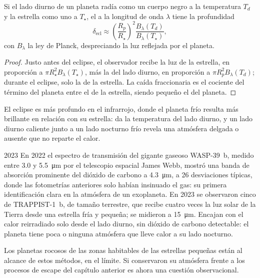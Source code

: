 \begin{proposition}\label{prop:b3:exoplanets:eclipse}
Si el lado diurno de un planeta radía como un cuerpo negro a la temperatura
$T_d$ y la estrella como uno a $T_\star$, el  a la
longitud de onda $\lambda$ tiene la profundidad
\[
\delta_\mathrm{ecl} \approx \left(\frac{R_p}{R_\star}\right)^2
  \frac{B_\lambda(T_d)}{B_\lambda(T_\star)},
\]
con $B_\lambda$ la ley de Planck, despreciando la luz reflejada por el planeta.
\end{proposition}

\begin{proof}
Justo antes del eclipse, el observador recibe la luz de la estrella, en
proporción a $\pi R_\star^2 B_\lambda(T_\star)$, más la del lado diurno,
en proporción a $\pi R_p^2 B_\lambda(T_d)$; durante el eclipse, solo la
de la estrella. La caída fraccionaria es el cociente del término del planeta
entre el de la estrella, siendo pequeño el del planeta.
\end{proof}

El eclipse es más profundo en el infrarrojo, donde el planeta frío resulta
más brillante en relación con su estrella: da la temperatura del lado diurno, y
un lado diurno caliente junto a un lado nocturno frío revela una atmósfera delgada o ausente
que no reparte el calor.

\begin{dated}{2023}
En 2022 el espectro de transmisión del gigante gaseoso WASP-39~b, medido
entre 3.0 y \qty{5.5}{\micro m} por el telescopio espacial James Webb,
mostró una banda de absorción prominente del dióxido de carbono a
\qty{4.3}{\micro m}, a 26 desviaciones típicas, donde las fotometrías anteriores
solo habían insinuado el gas: su primera identificación clara en
la atmósfera de un exoplaneta. En 2023 se observaron cinco 
de TRAPPIST-1~b, de tamaño terrestre, que recibe cuatro veces la luz solar de
la Tierra desde una estrella fría y pequeña; se midieron a \qty{15}{\micro m}. Encajan con
el calor reirradiado solo desde el lado diurno, sin dióxido de carbono
detectable: el planeta tiene poca o ninguna atmósfera que lleve calor a su
lado nocturno.
\end{dated}

Los planetas rocosos de las zonas habitables de las estrellas pequeñas
están al alcance de estos métodos, en el límite. Si conservaron su
atmósfera frente a los procesos de escape del capítulo anterior es ahora una
cuestión observacional.

